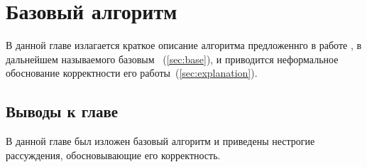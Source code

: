 \chapter{Базовый алгоритм}

В данной главе излагается краткое описание алгоритма предложеннго в работе \cite{Ohbuchi}, в дальнейшем называемого базовым~ 
(\ref{sec:base}), и приводится неформальное обоснование корректности его работы~(\ref{sec:explanation}).



\section{Выводы к главе}
В данной главе был изложен базовый алгоритм и приведены нестрогие рассуждения, обосновывающие его корректность.
